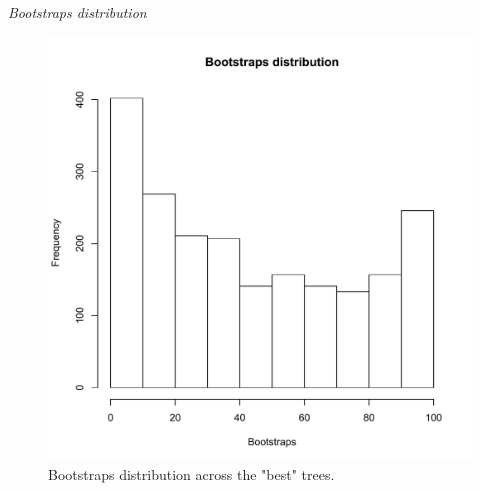 \documentclass[12pt,letterpaper]{article}
\renewcommand{\subsection}[1]{%
\bigskip
\begin{center}
\begin{large}
\normalfont\itshape #1
\end{large}
\end{center}}
\begin{document}
\subsection{Bootstraps distribution}

\begin{figure}
\centering
\includegraphics[keepaspectratio=true]{Figures/TEM_Fig-AppendixBootstraps.pdf}
\caption{Bootstraps distribution across the "best" trees.}                     %
\label{Fig_AppendixBoostraps}
\end{figure}


\end{document}
